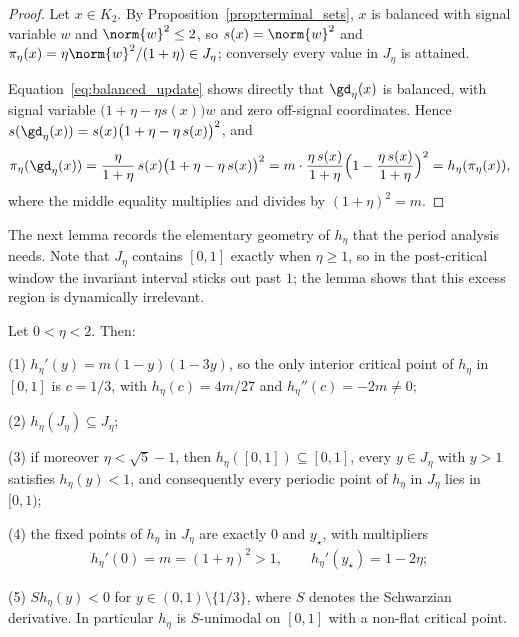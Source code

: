 \documentclass{article}
\begin{document}
\begin{proof}
Let $x\in K_2$. By Proposition~\ref{prop:terminal_sets}, $x$ is balanced with
signal variable $w$ and $\norm{w}^2\le2$, so $s(x)=\norm{w}^2$ and
$\pi_\eta(x)=\eta\norm{w}^2/(1+\eta)\in J_\eta$; conversely every value in
$J_\eta$ is attained.

Equation~\eqref{eq:balanced_update} shows directly that $\gd_\eta(x)$ is
balanced, with signal variable
$\bigl(1+\eta-\eta s(x)\bigr)w$ and zero off-signal coordinates. Hence
$s(\gd_\eta(x))=s(x)\bigl(1+\eta-\eta\,s(x)\bigr)^2$, and
\begin{align}
    \pi_\eta(\gd_\eta(x))
    =
    \frac{\eta}{1+\eta}\,s(x)\bigl(1+\eta-\eta\,s(x)\bigr)^2
    =
    m\cdot\frac{\eta\,s(x)}{1+\eta}\Bigl(1-\frac{\eta\,s(x)}{1+\eta}\Bigr)^2
    =
    h_\eta(\pi_\eta(x)),
\end{align}
where the middle equality multiplies and divides by $(1+\eta)^2=m$.
\end{proof}

The next lemma records the elementary geometry of $h_\eta$ that the period
analysis needs. Note that $J_\eta$ contains $[0,1]$ exactly when $\eta\ge1$, so
in the post-critical window the invariant interval sticks out past $1$; the
lemma shows that this excess region is dynamically irrelevant.

\begin{lemma}
\label{lem:normalized_cubic_range}
Let $0<\eta<2$. Then:

(1) $h_\eta'(y)=m(1-y)(1-3y)$, so the only interior critical point of $h_\eta$
in $[0,1]$ is $c=1/3$, with $h_\eta(c)=4m/27$ and $h_\eta''(c)=-2m\ne0$;

(2) $h_\eta(J_\eta)\subseteq J_\eta$;

(3) if moreover $\eta<\sqrt5-1$, then $h_\eta([0,1])\subseteq[0,1]$, every
$y\in J_\eta$ with $y>1$ satisfies $h_\eta(y)<1$, and consequently every
periodic point of $h_\eta$ in $J_\eta$ lies in $[0,1)$;

(4) the fixed points of $h_\eta$ in $J_\eta$ are exactly $0$ and $y_\star$,
with multipliers
\begin{align}
    h_\eta'(0)=m=(1+\eta)^2>1,
    \qquad
    h_\eta'(y_\star)=1-2\eta ;
    \label{eq:fixed_point_multipliers}
\end{align}

(5) $Sh_\eta(y)<0$ for $y\in(0,1)\setminus\{1/3\}$, where $S$ denotes the
Schwarzian derivative. In particular $h_\eta$ is $S$-unimodal on $[0,1]$ with a
non-flat critical point.
\end{lemma}
\end{document}

